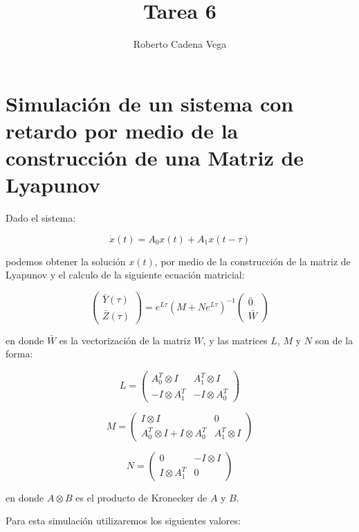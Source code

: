 \documentclass{article}
\title{Tarea 6}
\author{Roberto Cadena Vega}
\begin{document}
    
    
    \maketitle
    
    

    

    \section*{Simulación de un sistema con retardo por medio de la construcción de una
Matriz de Lyapunov}


    Dado el sistema:

\[
\dot{x}(t) = A_0 x(t) + A_1 x(t - \tau)
\]

podemos obtener la solución \(x(t)\), por medio de la construcción de la
matriz de Lyapunov y el calculo de la siguiente ecuación matricial:

\[
\begin{pmatrix}
\bar{Y}(\tau) \\
\bar{Z}(\tau)
\end{pmatrix} = e^{L \tau} \left( M + N e^{L \tau} \right)^{-1}
\begin{pmatrix}
\bar{0} \\
\bar{W}
\end{pmatrix}
\]

en donde \(\bar{W}\) es la vectorización de la matriz \(W\), y las
matrices \(L\), \(M\) y \(N\) son de la forma:

\[
L =
\begin{pmatrix}
A_0^T \otimes I & A_1^T \otimes I \\
-I \otimes A_1^T & -I \otimes A_0^T
\end{pmatrix}
\]

\[
M =
\begin{pmatrix}
I \otimes I & 0 \\
A_0^T \otimes I + I \otimes A_0^T & A_1^T \otimes I
\end{pmatrix}
\]

\[
N =
\begin{pmatrix}
0 & -I \otimes I \\
I \otimes A_1^T & 0
\end{pmatrix}
\]

en donde \(A \otimes B\) es el producto de Kronecker de \(A\) y \(B\).

Para esta simulación utilizaremos los siguientes valores:
\end{document}
